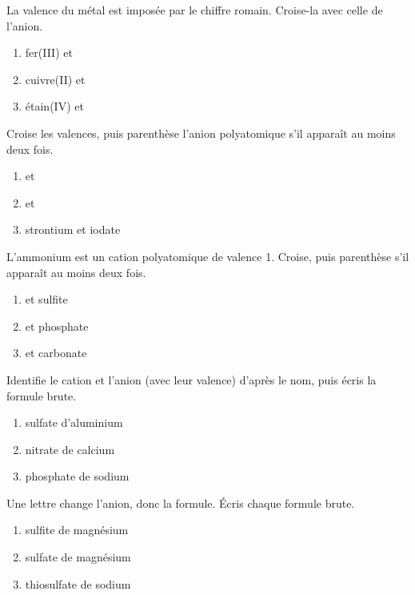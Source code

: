 \documentclass[11pt,a4paper]{article}
\begin{document}
\begin{exo}
La valence du métal est imposée par le chiffre romain. Croise-la avec celle de l'anion.
\begin{enumerate}[label=\alph*)]
  \item fer(III)  et 
  \item cuivre(II)  et 
  \item étain(IV)  et 
\end{enumerate}
\end{exo}

\begin{exo}
Croise les valences, puis parenthèse l'anion polyatomique s'il apparaît au moins deux fois.
\begin{enumerate}[label=\alph*)]
  \item {} et 
  \item {} et 
  \item strontium  et iodate 
\end{enumerate}
\end{exo}

\begin{exo}
L'ammonium  est un cation polyatomique de valence 1. Croise, puis parenthèse  s'il apparaît
au moins deux fois.
\begin{enumerate}[label=\alph*)]
  \item {} et sulfite 
  \item {} et phosphate 
  \item {} et carbonate 
\end{enumerate}
\end{exo}

\begin{exo}
Identifie le cation et l'anion (avec leur valence) d'après le nom, puis écris la formule brute.
\begin{enumerate}[label=\alph*)]
  \item sulfate d'aluminium
  \item nitrate de calcium
  \item phosphate de sodium
\end{enumerate}
\end{exo}

\begin{exo}
Une lettre change l'anion, donc la formule. Écris chaque formule brute.
\begin{enumerate}[label=\alph*)]
  \item sulfite de magnésium
  \item sulfate de magnésium
  \item thiosulfate de sodium
\end{enumerate}
\end{exo}
\end{document}
